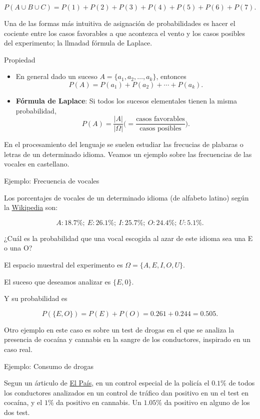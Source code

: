 \documentclass[
  letterpaper,
  DIV=11,
  numbers=noendperiod]{scrreprt}
\begin{document}
\[P(A\cup B\cup C)=P(1)+P(2)+P(3)+P(4)+P(5)+P(6)+P(7).\]

Una de las formas más intuitiva de asignación de probabilidades es hacer
el cociente entre los casos favorables a que acontezca el vento y los
casos posibles del experimento; la llmadad fórmula de Laplace.

Propiedad

\begin{itemize}
\item
  En general dado un suceso \(A=\{a_1,a_2,\ldots,a_k\}\), entonces \[
  P(A)=P(a_1)+P(a_2)+\cdots+P(a_k).
  \]
\item
  \textbf{Fórmula de Laplace}: Si todos los sucesos elementales tienen
  la misma probabilidad, \[
  P(A)=\frac{|A|}{|\Omega|}\Big(=\frac{\mbox{casos favorables}}{\mbox{casos posibles}}\Big).
  \]
\end{itemize}

En el procesamiento del lenguaje se suelen estudiar las frecucias de
plabaras o letras de un determinado idioma. Veamos un ejemplo sobre las
frecuencias de las vocales en castellano.

Ejemplo: Frecuencia de vocales

Los porcentajes de vocales de un determinado idioma (de alfabeto latino)
según la
\href{https://es.wikipedia.org/wiki/Frecuencia_de_aparici\%C3\%B3n_de_letras}{Wikipedia}
son:

\[A: 18.7\%;\ E: 26.1\%;\ I: 25.7\%;\ O: 24.4\%;\ U: 5.1\%.\]

¿Cuál es la probabilidad que una vocal escogida al azar de este idioma
sea una E o una O?

El espacio muestral del experimento es \(\Omega=\{A,E,I,O,U\}\).

El suceso que deseamos analizar es \(\{E,0\}\).

Y su probabilidad es

\[P(\{E,O\})=P(E)+P(O)=0.261+0.244=0.505.\]

Otro ejemplo en este caso es sobre un test de drogas en el que se
analiza la presencia de cocaína y cannabis en la sangre de los
conductores, inspirado en un caso real.

Ejemplo: Consumo de drogas

Segun un árticulo de
\href{https://elpais.com/politica/2019/01/02/actualidad/1546426491_623324.html}{El
País}, en un control especial de la policía el \(0.1\%\) de todos los
conductores analizados en un control de tráfico dan positivo en un el
test en cocaína, y el \(1\%\) da positivo en cannabis. Un \(1.05\%\) da
positivo en alguno de los dos test.
\end{document}
